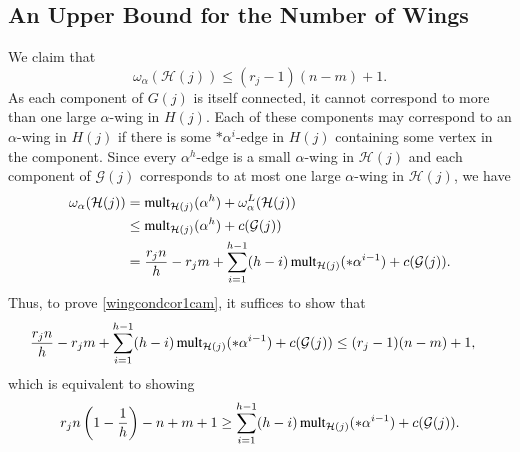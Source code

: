 \documentclass[12pt,oneside]{amsart}
\newcommand\mult{\operatorname{\textup{{\fontfamily{ptm}\selectfont mult}}}}
\newcommand{\cc}{\mathcal}
\begin{document}
\subsection{An Upper Bound for the Number of Wings} We claim that
\begin{equation}  \label{wingcondcor1cam}
\omega_\alpha(\cc H(j))\leq (r_j-1)(n-m)+1.
\end{equation}
As each component of $G(j)$ is itself connected, it cannot correspond to more than one large $\alpha$-wing in $H(j)$. Each of these components may correspond to an $\alpha$-wing in $H(j)$ if there is some $*\alpha^i$-edge in $H(j)$ containing some vertex in the component. Since every $\alpha^h$-edge is a small $\alpha$-wing in $\cc H(j)$ and each component of $\cc G(j)$ corresponds to at most one large  $\alpha$-wing in $\cc H(j)$, we have 
\begin{align*}
\omega_\alpha(\cc H(j))&=\mult_{\cc H(j)}(\alpha^h)+\omega^L_\alpha(\cc H(j))\\
&\leq  \mult_{\cc H(j)}(\alpha^h)+c(\cc G(j))\\
& = \frac{r_jn}{h} - r_jm + \sum_{i=1}^{h-1}(h-i)\mult_{\cc H(j)}(*\alpha^{i-1}) + c(\cc G(j)).
\end{align*}
Thus, to prove \eqref{wingcondcor1cam}, it suffices to show that
\begin{align*}
    \frac{r_jn}{h} - r_jm + \sum_{i=1}^{h-1}(h-i)\mult_{\cc H(j)}(*\alpha^{i-1}) + c(\cc G(j)) &\leq (r_j-1)(n-m) + 1,
\end{align*}
which is equivalent to showing
\begin{equation} \label{wingcondv2}
    r_j n\left(1-\frac{1}{h}\right) - n + m + 1 \geq \sum_{i=1}^{h-1}(h-i)\mult_{\cc H(j)}(*\alpha^{i-1}) + c(\cc G(j)).
\end{equation}
\end{document}
